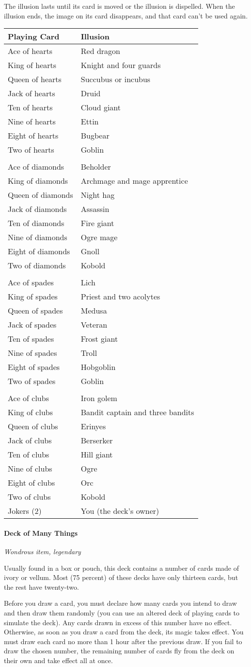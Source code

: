 \documentclass[
]{article}
\begin{document}
The illusion lasts until its card is moved or the illusion is dispelled.
When the illusion ends, the image on its card disappears, and that card
can't be used again.

\begin{longtable}[]{@{}ll@{}}
\toprule
Playing Card & Illusion\tabularnewline
\midrule
\endhead
Ace of hearts & Red dragon\tabularnewline
King of hearts & Knight and four guards\tabularnewline
Queen of hearts & Succubus or incubus\tabularnewline
Jack of hearts & Druid\tabularnewline
Ten of hearts & Cloud giant\tabularnewline
Nine of hearts & Ettin\tabularnewline
Eight of hearts & Bugbear\tabularnewline
Two of hearts & Goblin\tabularnewline
&\tabularnewline
Ace of diamonds & Beholder\tabularnewline
King of diamonds & Archmage and mage apprentice\tabularnewline
Queen of diamonds & Night hag\tabularnewline
Jack of diamonds & Assassin\tabularnewline
Ten of diamonds & Fire giant\tabularnewline
Nine of diamonds & Ogre mage\tabularnewline
Eight of diamonds & Gnoll\tabularnewline
Two of diamonds & Kobold\tabularnewline
&\tabularnewline
Ace of spades & Lich\tabularnewline
King of spades & Priest and two acolytes\tabularnewline
Queen of spades & Medusa\tabularnewline
Jack of spades & Veteran\tabularnewline
Ten of spades & Frost giant\tabularnewline
Nine of spades & Troll\tabularnewline
Eight of spades & Hobgoblin\tabularnewline
Two of spades & Goblin\tabularnewline
&\tabularnewline
Ace of clubs & Iron golem\tabularnewline
King of clubs & Bandit captain and three bandits\tabularnewline
Queen of clubs & Erinyes\tabularnewline
Jack of clubs & Berserker\tabularnewline
Ten of clubs & Hill giant\tabularnewline
Nine of clubs & Ogre\tabularnewline
Eight of clubs & Orc\tabularnewline
Two of clubs & Kobold\tabularnewline
Jokers (2) & You (the deck's owner)\tabularnewline
\bottomrule
\end{longtable}

\hypertarget{deck-of-many-things}{%
\paragraph{Deck of Many Things}\label{deck-of-many-things}}

\emph{Wondrous item, legendary}

Usually found in a box or pouch, this deck contains a number of cards
made of ivory or vellum. Most (75 percent) of these decks have only
thirteen cards, but the rest have twenty-two.

Before you draw a card, you must declare how many cards you intend to
draw and then draw them randomly (you can use an altered deck of playing
cards to simulate the deck). Any cards drawn in excess of this number
have no effect. Otherwise, as soon as you draw a card from the deck, its
magic takes effect. You must draw each card no more than 1 hour after
the previous draw. If you fail to draw the chosen number, the remaining
number of cards fly from the deck on their own and take effect all at
once.
\end{document}
